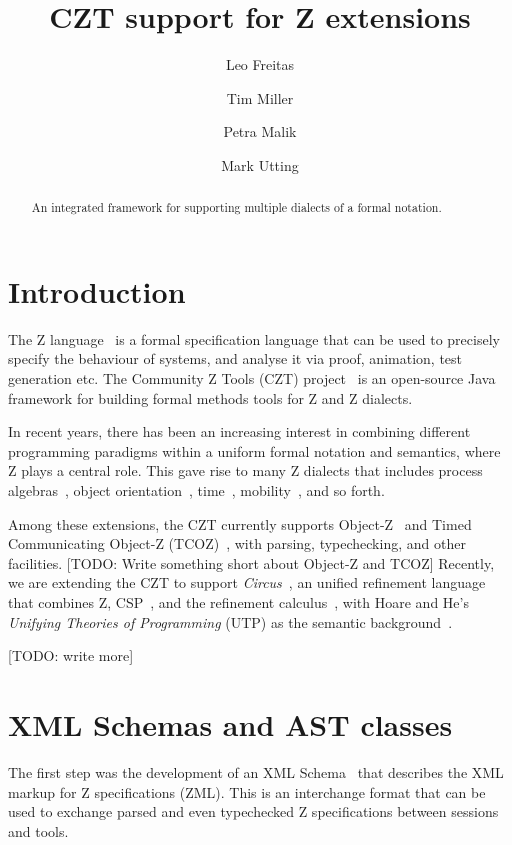 \documentclass{llncs}
\newcommand{\Circus}{{\sf\slshape Circus}}
\begin{document}
\title{CZT support for Z extensions}
\author{Leo Freitas \and Tim Miller \and Petra Malik \and Mark Utting}
\maketitle

\begin{abstract}
  An integrated framework for supporting multiple dialects of a formal
  notation.
\end{abstract}

\section{Introduction} \label{sec:intro}

  The Z language~\cite{isoz} is a formal specification language that
  can be used to precisely specify the behaviour of systems, and
  analyse it via proof, animation, test generation etc.  The Community
  Z Tools (CZT) project~\cite{czt} is an open-source Java framework
  for building formal methods tools for Z and Z dialects.

  In recent years, there has been an increasing interest in combining
  different programming paradigms within a uniform formal notation and
  semantics, where Z plays a central role. This gave rise to many Z
  dialects that includes process algebras~\cite{fischer-1998,fischer-2000,circus.sem:intro},
  object orientation~\cite{oz,ohcircus}, time~\cite{tcoz,circus.sem:real.time2},
  mobility~\cite{circus.sem:mobility}, and so forth.

  Among these extensions, the CZT currently supports Object-Z~\cite{oz} and
  Timed Communicating Object-Z (TCOZ)~\cite{tcoz}, with parsing, typechecking, and
  other facilities.
  [TODO: Write something short about Object-Z and TCOZ]
  Recently, we are extending the CZT to support \Circus~\cite{circus.sem:intro},
  an unified refinement language that combines Z, CSP~\cite{csp.books:roscoe},
  and the refinement calculus~\cite{fm.ref:morgan}, with Hoare and He's
  \textit{Unifying Theories of Programming} (UTP) as the semantic background~\cite{hoare.utp}.

  [TODO: write more]

\section{XML Schemas and AST classes}

  The first step was the development of an XML Schema~\cite{UttEA:03}
  that describes the XML markup for Z specifications (ZML).  This is
  an interchange format that can be used to exchange parsed and even
  typechecked Z specifications between sessions and tools.
\end{document}
